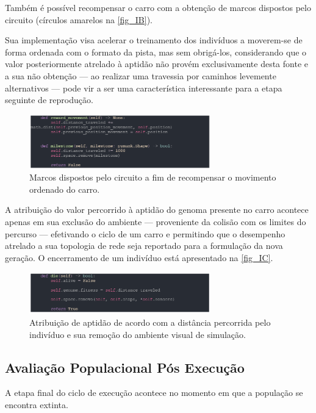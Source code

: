 Também é possível recompensar o carro com a obtenção de marcos dispostos pelo circuito (círculos amarelos na \autoref{fig_IB}). 

Sua implementação visa acelerar o treinamento dos indivíduos a moverem-se de forma ordenada com o
formato da pista, mas sem obrigá-los, considerando que o valor posteriormente atrelado à aptidão não
provém exclusivamente desta fonte e a sua não obtenção — ao realizar uma travessia por caminhos levemente
alternativos — pode vir a ser uma característica interessante para a etapa seguinte de reprodução.

\begin{figure}[htb]
        \centering
        \caption{\label{fig_IB}Marcos dispostos pelo circuito a fim de recompensar o movimento ordenado do carro.}
        \includegraphics[width=0.7\textwidth]{images/IB.png}
\end{figure}

A atribuição do valor percorrido à aptidão do genoma presente no carro acontece apenas em sua exclusão do ambiente
— proveniente da colisão com os limites do percurso — efetivando o ciclo de um carro e permitindo que o desempenho atrelado a
sua topologia de rede seja reportado para a formulação da nova geração. O encerramento de um indivíduo está apresentado na \autoref{fig_IC}.

\begin{figure}[htb]
        \centering
        \caption{\label{fig_IC}Atribuição de aptidão de acordo com a distância percorrida pelo indivíduo e sua remoção do ambiente visual de simulação.}
        \includegraphics[width=0.7\textwidth]{images/IC.png}
\end{figure}

\subsection{Avaliação Populacional Pós Execução}
A etapa final do ciclo de execução acontece no momento em que a população se encontra extinta.

